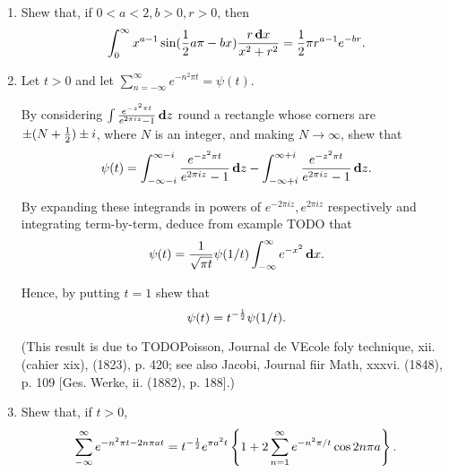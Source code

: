 \begin{enumerate}
%
\item
  Shew that, if $0 < a < 2, b > 0, r > 0$, then
  $$
  \int_{0}^{\infty}
  x^{a-1}
  \sin (\frac{1}{2} a\pi - bx )
  \frac{r \, \mathbf{d} x}{x^{2} + r^{2}}
  =
  \frac{1}{2} \pi r^{a-1} e^{-br}.
  $$
%
%

\item
  Let $t>0$ and let
  $
  \sum_{n=-\infty}^{\infty}
  e^{-n^{2} \pi t}
  =
  \psi(t).
  $

  By considering
  $
  \int \frac{e^{-z^{2} \pi t}}{e^{2\pi i z} - 1} \, \mathbf{d} z
  $
  round a rectangle whose corners are
  $\pm (N+\frac{1}{2}) \pm i$, where $N$ is an integer,
  and making $N \rightarrow \infty$, shew that
  $$
  \psi(t)
  =
  \int_{-\infty - i}^{\infty - i}
  \frac{e^{-z^{2} \pi t}}{e^{2\pi i z} - 1} \, \mathbf{d} z
  -
  \int_{-\infty + i}^{\infty + i}
  \frac{e^{-z^{2} \pi t}}{e^{2\pi i z} - 1} \, \mathbf{d} z.
  $$

  By expanding these integrands in powers of
  $e^{-2\pi i z}, e^{2\pi i z}$
  respectively
  and integrating term-by-term, deduce from example TODO that
  $$
  \psi(t)
  =
  \frac{1}{ \sqrt{\pi t} }
  \psi(1/t)
  \int_{-\infty}^{\infty} e^{-x^{2}} \, \mathbf{d} x.
  $$
  
  Hence, by putting $t = 1$ shew that
  $$
  \psi(t) = t^{-\frac{1}{2}} \psi(1/t).
  $$

  (This result is due to TODOPoisson, Journal de VEcole foly technique, xii.
  (cahier xix), (1823), p. 420; see also Jacobi, Journal fiir Math,
  xxxvi. (1848), p. 109 [Ges. Werke, ii. (1882), p. 188].) 

\item
  Shew that, if $t>0$,
  $$
  \sum_{-\infty}^{\infty}
  e^{-n^{2} \pi t - 2 n \pi a t}
  =
  t^{-\frac{1}{2}}
  e^{\pi a^{2} t}
  \left\{ 
    1
    +
    2
    \sum_{n=1}^{\infty}
    e^{-n^{2} \pi / t} \cos 2n\pi a
   \right\}.
  $$

\end{enumerate}
